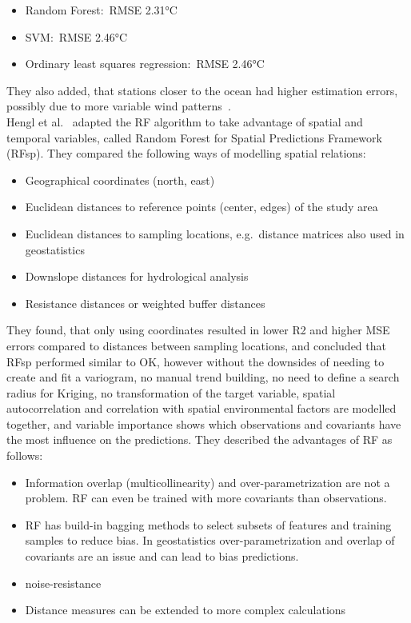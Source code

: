 \begin{itemize}
    \item Random Forest:\ RMSE 2.31°C
    \item SVM:\ RMSE 2.46°C
    \item Ordinary least squares regression:\ RMSE 2.46°C
\end{itemize}

They also added, that stations closer to the ocean had higher estimation errors, possibly due to more variable wind patterns~\cite{runnalls2000dynamics}.\\
Hengl et al.~\cite{hengl2018random} adapted the RF algorithm to take advantage of spatial and temporal variables, called Random Forest for Spatial Predictions Framework (RFsp). They compared the following ways of modelling spatial relations:

\begin{itemize}
    \item Geographical coordinates (north, east)
    \item Euclidean distances to reference points (center, edges) of the study area 
    \item Euclidean distances to sampling locations, e.g.\ distance matrices also used in geostatistics
    \item Downslope distances for hydrological analysis
    \item Resistance distances or weighted buffer distances
\end{itemize}

They found, that only using coordinates resulted in lower R2 and higher MSE errors compared to distances between sampling locations, and concluded that RFsp performed similar to OK, however without the downsides of needing to create and fit a variogram, no manual trend building, no need to define a search radius for Kriging, no transformation of the target variable, spatial autocorrelation and correlation with spatial environmental factors are modelled together, and variable importance shows which observations and covariants have the most influence on the predictions. They described the advantages of RF as follows:

\begin{itemize}
    \item Information overlap (multicollinearity) and over-parametrization are not a problem. RF can even be trained with more covariants than observations.
    \item RF has build-in bagging methods to select subsets of features and training samples to reduce bias. In geostatistics over-parametrization and overlap of covariants are an issue and can lead to bias predictions.
    \item noise-resistance~\cite{strobl2007bias}
    \item Distance measures can be extended to more complex calculations
\end{itemize}

